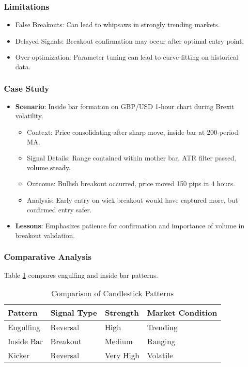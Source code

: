 \documentclass[12pt]{article}
\begin{document}
\subsubsection{Limitations}
\begin{itemize}
\item False Breakouts: Can lead to whipsaws in strongly trending markets.
\item Delayed Signals: Breakout confirmation may occur after optimal entry point.
\item Over-optimization: Parameter tuning can lead to curve-fitting on historical data.
\end{itemize}

\subsubsection{Case Study}
\begin{itemize}
\item \textbf{Scenario}: Inside bar formation on GBP/USD 1-hour chart during Brexit volatility.
  \begin{itemize}
  \item Context: Price consolidating after sharp move, inside bar at 200-period MA.
  \item Signal Details: Range contained within mother bar, ATR filter passed, volume steady.
  \item Outcome: Bullish breakout occurred, price moved 150 pips in 4 hours.
  \item Analysis: Early entry on wick breakout would have captured more, but confirmed entry safer.
  \end{itemize}
\item \textbf{Lessons}: Emphasizes patience for confirmation and importance of volume in breakout validation.
\end{itemize}

\subsubsection{Comparative Analysis}
Table \ref{tab:pattern_comparison} compares engulfing and inside bar patterns.

\begin{table}[H]
\centering
\caption{Comparison of Candlestick Patterns}
\label{tab:pattern_comparison}
\begin{tabular}{@{}llll@{}}
\toprule
Pattern & Signal Type & Strength & Market Condition \\
\midrule
Engulfing & Reversal & High & Trending \\
Inside Bar & Breakout & Medium & Ranging \\
Kicker & Reversal & Very High & Volatile \\
\bottomrule
\end{tabular}
\end{table}
\end{document}
